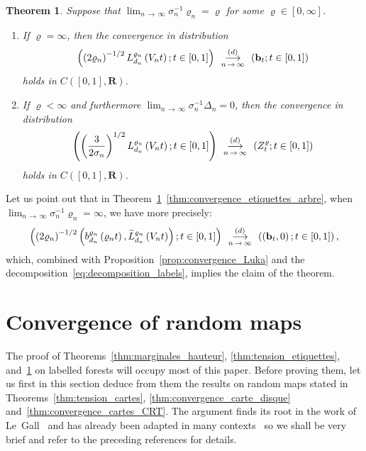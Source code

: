 \documentclass[10pt]{amsart}
\newtheorem{theo}{Theorem}[section]
\theoremstyle{definition}\newtheorem{defi}[theo]{Definition}\newtheorem{rema}[theo]{Remark}\newtheorem{exam}[theo]{Example}\newtheorem{exem}[theo]{Example}\newtheorem{nota}[theo]{Notation}
\newcommand{\ensembles}[1]{\mathbf{#1}}
\newcommand{\R}{\ensembles{R}}
\newcommand{\1}{\ensembles{1}}
\newcommand{\tildep}[1]{\widetilde{#1}\vphantom{#1}}
\newcommand{\bb}{\mathbf{b}}
\newcommand{\Cmap}{C}
\newcommand{\Lfn}{L_{d_n}^{\varrho_n}}
\newcommand{\tLfn}{\tildep{L}_{d_n}^{\varrho_n}}
\newcommand{\bfn}{b_{d_n}^{\varrho_n}}
\newcommand{\vertices}{V}
\newcommand{\cvloi}[1][n]{\enskip\mathop{\longrightarrow}^{(d)}_{#1\,\to\, \infty}\enskip}
\providecommand{\?}{}
\begin{document}
\begin{theo}\label{thm:convergence_etiquettes}
Suppose that $\lim_{n\,\to\,\infty} \sigma_n^{-1} \varrho_n = \varrho$ for some $\varrho \in [0,\infty]$.
\begin{enumerate}
\item\label{thm:convergence_etiquettes_arbre}
If $\varrho = \infty$, then the convergence in distribution
\[
\left(\left(2\varrho_n\right)^{-1/2} \Lfn\left(\vertices_n t\right); t \in [0,1]\right) \cvloi \left(\bb_t; t \in [0,1]\right)
\]
holds in $\Cmap([0,1],\R)$.

\item\label{thm:convergence_etiquettes_carte_disque}
If $\varrho < \infty$ and furthermore $\lim_{n\,\to\,\infty} \sigma_n^{-1} \Delta_n = 0$, then the convergence in distribution
\[
\left(\left(\frac{3}{2\sigma_n}\right)^{1/2} \Lfn\left(\vertices_n t\right) ; t \in [0,1]\right) \cvloi \left(Z^\varrho_t; t \in [0,1]\right)
\]
holds in $\Cmap([0,1],\R)$.
\end{enumerate}
\end{theo}

Let us point out that in Theorem~\ref{thm:convergence_etiquettes}~\eqref{thm:convergence_etiquettes_arbre}, when $\lim_{n\,\to\,\infty} \sigma_n^{-1} \varrho_n = \infty$, we have more precisely:
\[
\left(\left(2\varrho_n\right)^{-1/2} \left(\bfn\left(\varrho_n t\right), \tLfn\left(\vertices_n t\right)\right); t \in [0,1]\right) \cvloi \left(\left(\bb_t, 0\right); t \in [0,1]\right),
\]
which, combined with Proposition~\ref{prop:convergence_Luka} and the decomposition~\eqref{eq:decomposition_labels}, implies the claim of the theorem.



\section{Convergence of random maps}\label{sec:convergence_cartes}

The proof of Theorems~\ref{thm:marginales_hauteur}, \ref{thm:tension_etiquettes}, and~\ref{thm:convergence_etiquettes} on labelled forests will occupy most of this paper. Before proving them, let us first in this section deduce from them the results on random maps stated in Theorems~\ref{thm:tension_cartes}, \ref{thm:convergence_carte_disque} and~\ref{thm:convergence_cartes_CRT}. The argument finds its root in the work of Le~Gall~\cite{LG13} and has already been adapted in many contexts~\cite{ABA17,ABA21,Abr16,BJM14,BM17,LG13,Mar18a,Mar18b} so we shall be very brief and refer to the preceding references for details.
\end{document}
